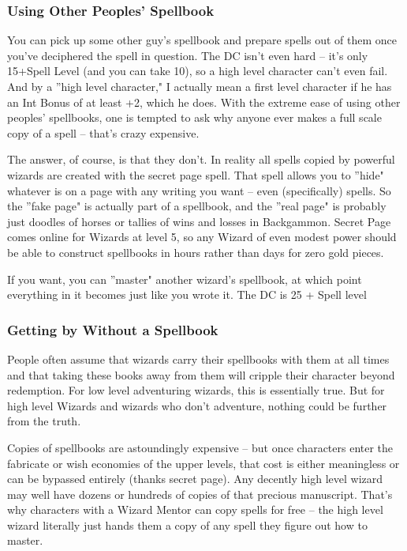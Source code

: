 \subsubsection{Using Other Peoples' Spellbook}

You can pick up some other guy's spellbook and prepare spells out of them once you've deciphered the spell in question. The DC isn't even hard -- it's only 15+Spell Level (and you can take 10), so a high level character can't even fail. And by a ''high level character," I actually mean a first level character if he has an Int Bonus of at least +2, which he does. With the extreme ease of using other peoples' spellbooks, one is tempted to ask why anyone ever makes a full scale copy of a spell -- that's crazy expensive.

The answer, of course, is that they don't. In reality all spells copied by powerful wizards are created with the secret page spell. That spell allows you to ''hide" whatever is on a page with any writing you want -- even (specifically) spells. So the ''fake page" is actually part of a spellbook, and the ''real page" is probably just doodles of horses or tallies of wins and losses in Backgammon. Secret Page comes online for Wizards at level 5, so any Wizard of even modest power should be able to construct spellbooks in hours rather than days for zero gold pieces.

If you want, you can ''master" another wizard's spellbook, at which point everything in it becomes just like you wrote it. The DC is 25 + Spell level

\subsubsection{Getting by Without a Spellbook}

People often assume that wizards carry their spellbooks with them at all times and that taking these books away from them will cripple their character beyond redemption. For low level adventuring wizards, this is essentially true. But for high level Wizards and wizards who don't adventure, nothing could be further from the truth.

Copies of spellbooks are astoundingly expensive -- but once characters enter the fabricate or wish economies of the upper levels, that cost is either meaningless or can be bypassed entirely (thanks secret page). Any decently high level wizard may well have dozens or hundreds of copies of that precious manuscript. That's why characters with a Wizard Mentor can copy spells for free -- the high level wizard literally just hands them a copy of any spell they figure out how to master.

